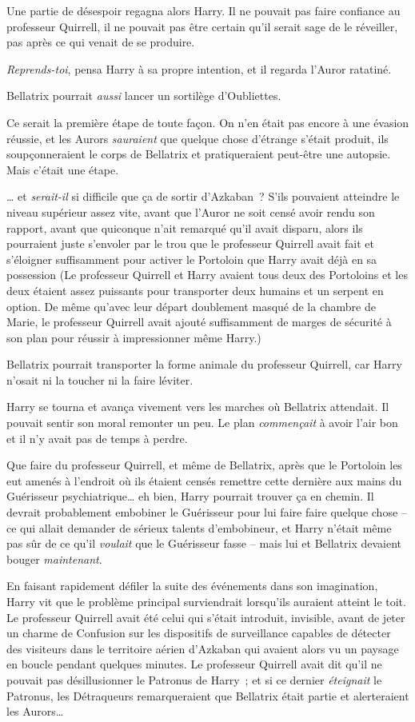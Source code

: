 Une partie de désespoir regagna alors Harry. Il ne pouvait pas faire confiance au professeur Quirrell, il ne pouvait pas être certain qu'il serait sage de le réveiller, pas après ce qui venait de se produire.

\emph{Reprends-toi}, pensa Harry à sa propre intention, et il regarda l'Auror ratatiné.

Bellatrix pourrait \emph{aussi} lancer un sortilège d'Oubliettes.

Ce serait la première étape de toute façon. On n'en était pas encore à une évasion réussie, et les Aurors \emph{sauraient} que quelque chose d'étrange s'était produit, ils soupçonneraient le corps de Bellatrix et pratiqueraient peut-être une autopsie. Mais c'était une étape.

… et \emph{serait-il} si difficile que ça de sortir d'Azkaban~? S'ils pouvaient atteindre le niveau supérieur assez vite, avant que l'Auror ne soit censé avoir rendu son rapport, avant que quiconque n'ait remarqué qu'il avait disparu, alors ils pourraient juste s'envoler par le trou que le professeur Quirrell avait fait et s'éloigner suffisamment pour activer le Portoloin que Harry avait déjà en sa possession (Le professeur Quirrell et Harry avaient tous deux des Portoloins et les deux étaient assez puissants pour transporter deux humains et un serpent en option. De même qu'avec leur départ doublement masqué de la chambre de Marie, le professeur Quirrell avait ajouté suffisamment de marges de sécurité à son plan pour réussir à impressionner même Harry.)

Bellatrix pourrait transporter la forme animale du professeur Quirrell, car Harry n'osait ni la toucher ni la faire léviter.

Harry se tourna et avança vivement vers les marches où Bellatrix attendait. Il pouvait sentir son moral remonter un peu. Le plan \emph{commençait} à avoir l'air bon et il n'y avait pas de temps à perdre.

Que faire du professeur Quirrell, et même de Bellatrix, après que le Portoloin les eut amenés à l'endroit où ils étaient censés remettre cette dernière aux mains du Guérisseur psychiatrique… eh bien, Harry pourrait trouver ça en chemin. Il devrait probablement embobiner le Guérisseur pour lui faire faire quelque chose -- ce qui allait demander de sérieux talents d'embobineur, et Harry n'était même pas sûr de ce qu'il \emph{voulait} que le Guérisseur fasse -- mais lui et Bellatrix devaient bouger \emph{maintenant}.

En faisant rapidement défiler la suite des événements dans son imagination, Harry vit que le problème principal surviendrait lorsqu'ils auraient atteint le toit. Le professeur Quirrell avait été celui qui s'était introduit, invisible, avant de jeter un charme de Confusion sur les dispositifs de surveillance capables de détecter des visiteurs dans le territoire aérien d'Azkaban qui avaient alors vu un paysage en boucle pendant quelques minutes. Le professeur Quirrell avait dit qu'il ne pouvait pas désillusionner le Patronus de Harry~; et si ce dernier \emph{éteignait} le Patronus, les Détraqueurs remarqueraient que Bellatrix était partie et alerteraient les Aurors…

